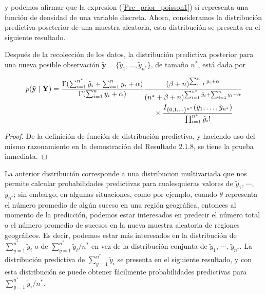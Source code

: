     y podemos afirmar que la expresion (\ref{Pre_prior_poisson1}) s\'i representa una funci\'on de densidad de una variable discreta. Ahora, consideramos la distribuci\'on predictiva poseterior de una muestra aleatoria, esta distribuci\'on se presenta en el siguiente resultado.
    
    \begin{Res}
    \label{ResPoissonPred}
    Despu\'es de la recolecci\'on de los datos, la distribuci\'on predictiva posterior para una nueva posible observaci\'on $\tilde{\mathbf{y}}=\{\tilde{y}_1,\ldots,\tilde{y}_{n^*}\}$, de tama\~no $n^*$, est\'a dada por
    
    \begin{align}
    p(\tilde{\mathbf{y}} \mid \mathbf{Y})&=\frac{\Gamma(\sum_{i=1}^{n^*}\tilde{y}_i+\sum_{i=1}^ny_i+\alpha)}{\Gamma(\sum_{i=1}^ny_i+\alpha)}
    \frac{(\beta+n)^{\sum_{i=1}^ny_i+\alpha}}{({n^*}+\beta+n)^{\sum_{i=1}^{n^*}\tilde{y}_i+\sum_{i=1}^ny_i+\alpha}}\notag\\
    &\hspace{5cm}\times
    \frac{I_{\{0,1,\ldots\}^{n^*}}(\tilde{y}_1,\ldots,\tilde{y}_{n^*})}{\prod_{i=1}^{n^*}\tilde{y}_i!}
    \end{align}
    \end{Res}
    
    \begin{proof}
    De la definici\'on de funci\'on de distribuci\'on predictiva, y haciendo uso del mismo razonamiento en la demostraci\'on del Resultado 2.1.8, se tiene la prueba inmediata.
    \end{proof}
    
    La anterior distribuci\'on corresponde a una distribucion multivariada que nos permite calcular probabilidades predictivas para cualesquieras valores de $\tilde{y}_1$, $\cdots$, $\tilde{y}_{n^*}$; sin embargo, en algunas situaciones, como por ejemplo, cuando $\theta$ representa el n\'umero promedio de alg\'un suceso en una regi\'on geogr\'afica, entonces al momento de la predicci\'on, podemos estar interesados en predecir el n\'umero total o el n\'umero promedio de sucesos en la nueva muestra aleatoria de regiones geogr\'aficos. Es decir, podemos estar m\'as interesados en la distribuci\'on de $\sum_{y=1}^{n^*} \tilde{y}_i$ o de $\sum_{y=1}^{n^*} \tilde{y}_i/n^*$ en vez de la distribuci\'on conjunta de $\tilde{y}_1$, $\cdots$, $\tilde{y}_{n^*}$. La distribuci\'on predictiva de $\sum_{y=1}^{n^*} \tilde{y}_i$ se presenta en el siguiente resultado, y con esta distribuci\'on se puede obtener f\'acilmente probabilidades predictivas para $\sum_{y=1}^{n^*} \tilde{y}_i/n^*$.
    
